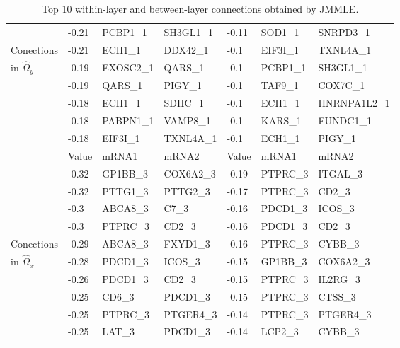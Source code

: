 \begin{table}[t!]
\begin{tabular}{l|lll|lll}
    ~ & -0.21 & PCBP1\_1   & SH3GL1\_1 & -0.11 & SOD1\_1  & SNRPD3\_1    \\
Conections & -0.21 & ECH1\_1    & DDX42\_1  & -0.1  & EIF3I\_1 & TXNL4A\_1    \\
in $\widehat \Omega_y$ & -0.19 & EXOSC2\_1  & QARS\_1   & -0.1  & PCBP1\_1 & SH3GL1\_1    \\
    ~ & -0.19 & QARS\_1    & PIGY\_1   & -0.1  & TAF9\_1  & COX7C\_1     \\
    ~ & -0.18 & ECH1\_1    & SDHC\_1   & -0.1  & ECH1\_1  & HNRNPA1L2\_1 \\
    ~ & -0.18 & PABPN1\_1  & VAMP8\_1  & -0.1  & KARS\_1  & FUNDC1\_1    \\
    ~ & -0.18 & EIF3I\_1   & TXNL4A\_1 & -0.1  & ECH1\_1  & PIGY\_1      \\ \hline
    \hline
    ~ & Value &    mRNA1 & mRNA2     & Value & mRNA1    & mRNA2     \\\cline{2-7}
    ~ & -0.32 & GP1BB\_3 & COX6A2\_3 & -0.19 & PTPRC\_3 & ITGAL\_3  \\
    ~ & -0.32 & PTTG1\_3 & PTTG2\_3  & -0.17 & PTPRC\_3 & CD2\_3    \\
    ~ & -0.3  & ABCA8\_3 & C7\_3     & -0.16 & PDCD1\_3 & ICOS\_3   \\
    ~ & -0.3  & PTPRC\_3 & CD2\_3    & -0.16 & PDCD1\_3 & CD2\_3    \\
Conections & -0.29 & ABCA8\_3 & FXYD1\_3  & -0.16 & PTPRC\_3 & CYBB\_3   \\
in $\widehat \Omega_x$ & -0.28 & PDCD1\_3 & ICOS\_3   & -0.15 & GP1BB\_3 & COX6A2\_3 \\
    ~ & -0.26 & PDCD1\_3 & CD2\_3    & -0.15 & PTPRC\_3 & IL2RG\_3  \\
    ~ & -0.25 & CD6\_3   & PDCD1\_3  & -0.15 & PTPRC\_3 & CTSS\_3   \\
    ~ & -0.25 & PTPRC\_3 & PTGER4\_3 & -0.14 & PTPRC\_3 & PTGER4\_3 \\
    ~ & -0.25 & LAT\_3   & PDCD1\_3  & -0.14 & LCP2\_3  & CYBB\_3   \\ \hline
    \end{tabular}
\caption{Top 10 within-layer and between-layer connections obtained by JMMLE.}
\label{table:top10}
\end{table}

